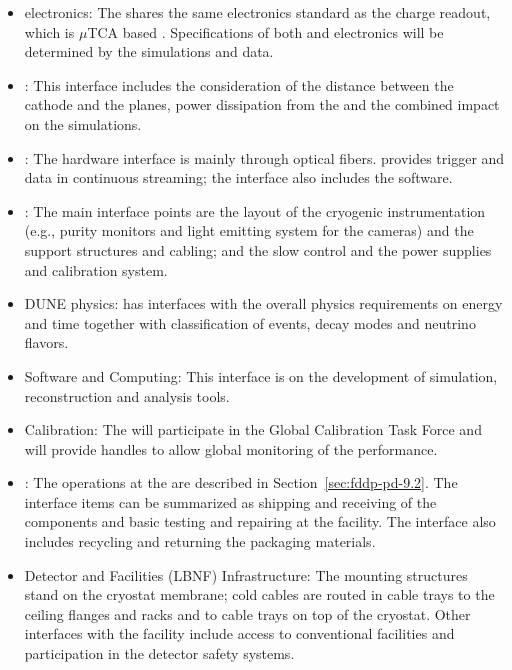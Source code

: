 \begin{itemize}

\item {} electronics: The  shares the same  electronics standard as the charge readout, which is $\mu$TCA based \cite{utca}. Specifications of both  and  electronics will be determined by the simulations and  data.

\item {}: This interface includes the consideration of the distance between the cathode and the  planes, power dissipation from the  and the combined impact on the simulations.

\item {}: The hardware interface is mainly through optical fibers.   provides trigger and data in continuous streaming;  the interface also includes the  software.

\item {}: The main interface points are the layout of the cryogenic instrumentation (e.g., purity monitors and light emitting system for the cameras) and the  support structures and cabling; and the slow control and the  power supplies and calibration system.

\item DUNE physics: \dual {} has interfaces with the overall physics requirements on energy and time together with classification of events, decay modes and neutrino flavors.

\item Software and Computing: This interface is on the development of simulation, reconstruction and analysis tools.

\item Calibration: The  will participate in the Global Calibration Task Force and will provide handles to allow global monitoring of the  performance.

\item {}: The operations at the  are described in Section~\ref{sec:fddp-pd-9.2}. The interface items can be summarized as shipping and receiving of the  components and basic testing and repairing at the facility. The interface also includes recycling and returning the packaging materials.

\item Detector and Facilities (LBNF) Infrastructure: The  %
 mounting structures stand on the cryostat membrane; cold cables are routed in cable trays to the ceiling \fdth flanges and racks and to cable trays on top of the cryostat. Other interfaces with the facility include access to conventional facilities and participation in the detector safety systems. 


\end{itemize}
